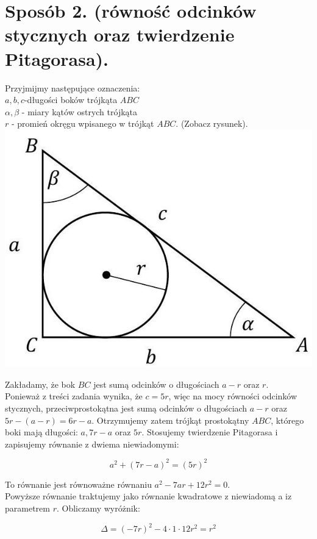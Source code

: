 \documentclass[10pt]{article}
\begin{document}
\section*{Sposób 2. (równość odcinków stycznych oraz twierdzenie Pitagorasa).}
Przyjmijmy następujące oznaczenia:\\
$a, b, c$-długości boków trójkąta $A B C$\\
$\alpha, \beta$ - miary kątów ostrych trójkąta\\
$r$ - promień okręgu wpisanego w trójkąt $A B C$. (Zobacz rysunek).\\
\includegraphics[max width=\textwidth, center]{2025_02_07_36131546116d12814c9cg-40}

Zakładamy, że bok $B C$ jest sumą odcinków o długościach $a-r$ oraz $r$.\\
Ponieważ z treści zadania wynika, że $c=5 r$, więc na mocy równości odcinków stycznych, przeciwprostokątna jest sumą odcinków o długościach $a-r$ oraz $5 r-(a-r)=6 r-a$. Otrzymujemy zatem trójkąt prostokątny $A B C$, którego boki mają długości: $a, 7 r-a$ oraz $5 r$. Stosujemy twierdzenie Pitagorasa i zapisujemy równanie z dwiema niewiadomymi:

$$
a^{2}+(7 r-a)^{2}=(5 r)^{2}
$$

To równanie jest równoważne równaniu $a^{2}-7 a r+12 r^{2}=0$.\\
Powyższe równanie traktujemy jako równanie kwadratowe z niewiadomą a iz parametrem $r$. Obliczamy wyróżnik:

$$
\Delta=(-7 r)^{2}-4 \cdot 1 \cdot 12 r^{2}=r^{2}
$$
\end{document}
